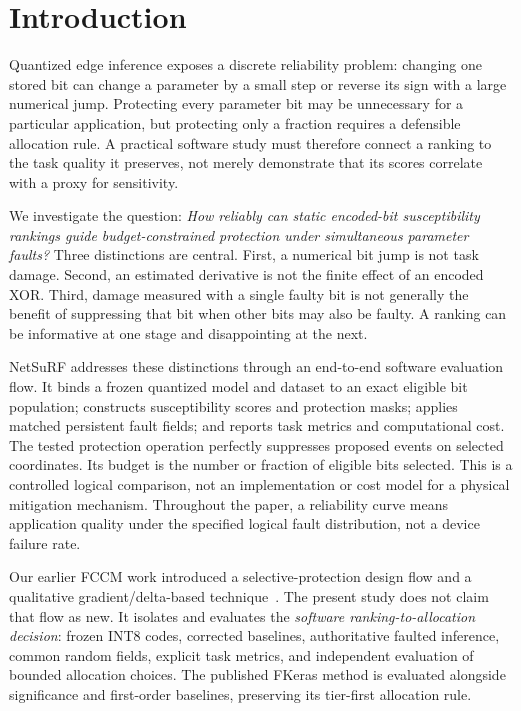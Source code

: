 \section{Introduction}
Quantized edge inference exposes a discrete reliability problem: changing one stored bit can change a parameter by a small step or reverse its sign with a large numerical jump. Protecting every parameter bit may be unnecessary for a particular application, but protecting only a fraction requires a defensible allocation rule. A practical software study must therefore connect a ranking to the task quality it preserves, not merely demonstrate that its scores correlate with a proxy for sensitivity.

We investigate the question: \emph{How reliably can static encoded-bit susceptibility rankings guide budget-constrained protection under simultaneous parameter faults?} Three distinctions are central. First, a numerical bit jump is not task damage. Second, an estimated derivative is not the finite effect of an encoded XOR. Third, damage measured with a single faulty bit is not generally the benefit of suppressing that bit when other bits may also be faulty. A ranking can be informative at one stage and disappointing at the next.

NetSuRF addresses these distinctions through an end-to-end software evaluation flow. It binds a frozen quantized model and dataset to an exact eligible bit population; constructs susceptibility scores and protection masks; applies matched persistent fault fields; and reports task metrics and computational cost. The tested protection operation perfectly suppresses proposed events on selected coordinates. Its budget is the number or fraction of eligible bits selected. This is a controlled logical comparison, not an implementation or cost model for a physical mitigation mechanism. Throughout the paper, a reliability curve means application quality under the specified logical fault distribution, not a device failure rate.

Our earlier FCCM work introduced a selective-protection design flow and a qualitative gradient/delta-based technique~\cite{guo2025inpixel}. The present study does not claim that flow as new. It isolates and evaluates the \emph{software ranking-to-allocation decision}: frozen INT8 codes, corrected baselines, authoritative faulted inference, common random fields, explicit task metrics, and independent evaluation of bounded allocation choices. The published FKeras method is evaluated alongside significance and first-order baselines, preserving its tier-first allocation rule.

